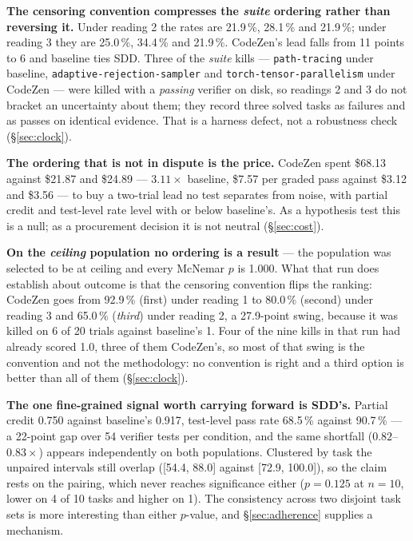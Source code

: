 \documentclass[11pt,a4paper]{article}
\newcommand{\task}[1]{\texttt{\footnotesize #1}}
\begin{document}
\textbf{The censoring convention compresses the \emph{suite} ordering rather than reversing
it.} Under reading 2 the rates are 21.9\,\%, 28.1\,\% and 21.9\,\%; under reading 3 they are
25.0\,\%, 34.4\,\% and 21.9\,\%. CodeZen's lead falls from 11 points to 6 and baseline ties
SDD. Three of the \emph{suite} kills --- \task{path-tracing} under baseline,
\task{adaptive-rejection-sampler} and \task{torch-tensor-parallelism} under CodeZen --- were
killed with a \emph{passing} verifier on disk, so readings 2 and 3 do not bracket an
uncertainty about them; they record three solved tasks as failures and as passes on identical
evidence. That is a harness defect, not a robustness check (\S\ref{sec:clock}).

\textbf{The ordering that is not in dispute is the price.} CodeZen spent \$68.13 against
\$21.87 and \$24.89 --- $3.11\times$ baseline, \$7.57 per graded pass against \$3.12 and
\$3.56 --- to buy a two-trial lead no test separates from noise, with partial credit and
test-level rate level with or below baseline's. As a hypothesis test this is a null; as a
procurement decision it is not neutral (\S\ref{sec:cost}).

\textbf{On the \emph{ceiling} population no ordering is a result} --- the population was
selected to be at ceiling and every McNemar $p$ is 1.000. What that run does establish about
outcome is that the censoring convention flips the ranking: CodeZen goes from 92.9\,\% (first)
under reading 1 to 80.0\,\% (second) under reading 3 and 65.0\,\% (\emph{third}) under
reading 2, a 27.9-point swing, because it was killed on 6 of 20 trials against baseline's 1.
Four of the nine kills in that run had already scored 1.0, three of them CodeZen's, so most of
that swing is the convention and not the methodology: no convention is right and a third
option is better than all of them (\S\ref{sec:clock}).

\textbf{The one fine-grained signal worth carrying forward is SDD's.} Partial credit 0.750
against baseline's 0.917, test-level pass rate 68.5\,\% against 90.7\,\% --- a 22-point gap
over 54 verifier tests per condition, and the same shortfall ($0.82$--$0.83\times$) appears
independently on both populations. Clustered by task the unpaired intervals still overlap
([54.4, 88.0] against [72.9, 100.0]), so the claim rests on the pairing, which never reaches
significance either ($p = 0.125$ at $n = 10$, lower on 4 of 10 tasks and higher on 1).
The consistency across two disjoint task sets is more interesting than either $p$-value, and
\S\ref{sec:adherence} supplies a mechanism.
\end{document}
